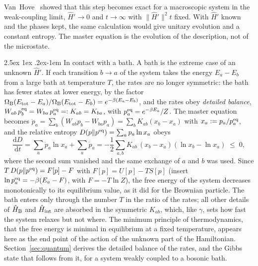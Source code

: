 \documentclass[10pt,a4paper]{article}
\makeatletter
\renewcommand{\paragraph}{\@startsection{paragraph}{4}{\z@}%
  {2.5ex \@plus 1ex \@minus .2ex}{-1em}%
  {\normalfont\fontsize{14pt}{17pt}\selectfont\bfseries}}
\newcommand{\dd}{\mathrm{d}}
\makeatother
\begin{document}
Van~Hove~\cite{vanHove1955} showed that this step becomes exact for a macroscopic system in the weak-coupling limit, $ \hat H' \to 0 $ and $ t \to \infty $ with $ \|\hat H'\|^{2}t $ fixed.
With $ \hat H' $ known and the phases kept, the same calculation would give unitary evolution and a constant entropy.
The master equation is the evolution of the description, not of the microstate.

\paragraph{In contact with a bath.}
A bath is the extreme case of an unknown $ \hat H' $.
If each transition $ b \to a $ of the system takes the energy $ E_a - E_b $ from a large bath at temperature $ T $, the rates are no longer symmetric: the bath has fewer states at lower energy, by the factor $ \Omega_{\rm B}(E_{\rm tot} - E_a)/\Omega_{\rm B}(E_{\rm tot} - E_b) = e^{-\beta(E_a - E_b)} $, and the rates obey \emph{detailed balance}, $ W_{ab}\,p_b^{\rm eq} = W_{ba}\,p_a^{\rm eq} =: K_{ab} = K_{ba} $, with $ p_a^{\rm eq} = e^{-\beta E_a}/Z $.
The master equation becomes $ \dot p_a = \sum_b(W_{ab}p_b - W_{ba}p_a) = \sum_bK_{ab}(x_b - x_a) $ with $ x_a := p_a/p_a^{\rm eq} $, and the relative entropy $ D(p \Vert p^{\rm eq}) = \sum_ap_a\ln x_a $ obeys
\[
  \frac{\dd D}{\dd t} = \sum_a\dot p_a\ln x_a + \sum_a\dot p_a
  = -\frac{1}{2}\sum_{a,b}K_{ab}\,(x_b - x_a)(\ln x_b - \ln x_a) \;\leq\; 0 ,
\]
where the second sum vanished and the same exchange of $ a $ and $ b $ was used.
Since $ T\,D(p \Vert p^{\rm eq}) = F[p] - F $ with $ F[p] = U[p] - TS[p] $ (insert $ \ln p_a^{\rm eq} = -\beta(E_a - F) $, with $ F = -T\ln Z $), the free energy of the system decreases monotonically to its equilibrium value, as it did for the Brownian particle.
The bath enters only through the number $ T $ in the ratio of the rates; all other details of $ \hat H_{\rm B} $ and $ \hat H_{\rm int} $ are absorbed in the symmetric $ K_{ab} $, which, like $ \gamma $, sets how fast the system relaxes but not where.
The minimum principle of thermodynamics, that the free energy is minimal in equilibrium at a fixed temperature, appears here as the end point of the action of the unknown part of the Hamiltonian.
Section~\ref{sec:quantum} derives the detailed balance of the rates, and the Gibbs state that follows from it, for a system weakly coupled to a bosonic bath.
\end{document}
